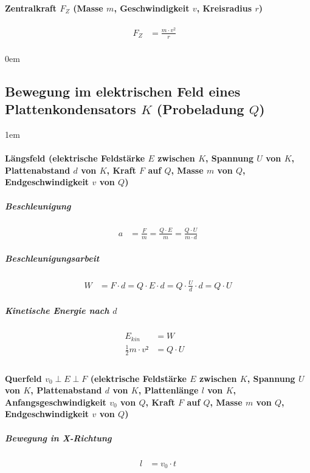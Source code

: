 \paragraph{Zentralkraft $F_Z$ (Masse $m$, Geschwindigkeit $v$, Kreisradius $r$)}
\begin{align*}
  F_Z &= \frac{m \cdot v^2}{r} &\\
\end{align*}

\leftskip0em

\subsection{Bewegung im elektrischen Feld eines Plattenkondensators $K$ (Probeladung $Q$)}

\leftskip1em
\paragraph{Längsfeld (elektrische Feldstärke $E$ zwischen $K$, Spannung $U$ von $K$,
Plattenabstand $d$ von $K$, Kraft $F$ auf $Q$, Masse $m$ von $Q$, Endgeschwindigkeit $v$ von $Q$)}

\subparagraph{Beschleunigung}
\begin{align*}
  a &= \frac{F}{m} = \frac{Q \cdot E}{m} = \frac{Q \cdot U}{m \cdot d}
\end{align*}

\subparagraph{Beschleunigungsarbeit}
\begin{align*}
  W &= F \cdot d = Q \cdot E \cdot d = Q \cdot \frac{U}{d} \cdot d = Q \cdot U
\end{align*}

\subparagraph{Kinetische Energie nach $d$}
\begin{align*}
  E_{kin} &= W &\\
  \frac{1}{2} m \cdot v² &= Q \cdot U &\\
\end{align*}

\paragraph{Querfeld $v_0 \perp E \perp F$ (elektrische Feldstärke $E$ zwischen $K$, Spannung $U$ von
$K$, Plattenabstand $d$ von $K$, Plattenlänge $l$ von $K$, Anfangsgeschwindigkeit $v_0$ von $Q$,
Kraft $F$ auf $Q$, Masse $m$ von $Q$, Endgeschwindigkeit $v$ von $Q$)}

\subparagraph{Bewegung in X-Richtung}
\begin{align*}
  l &= v_0 \cdot t
\end{align*}

